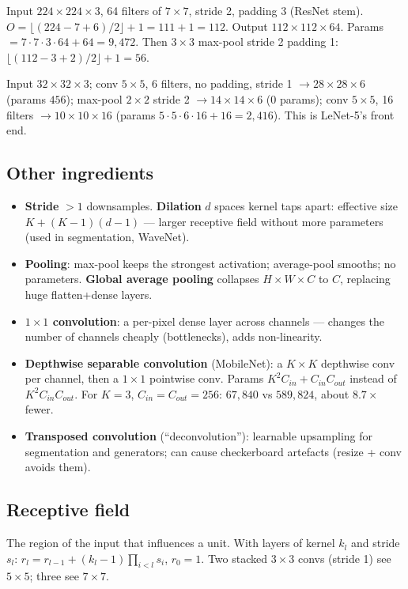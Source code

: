 \begin{example}
Input $224\times224\times3$, 64 filters of $7\times7$, stride 2, padding 3 (ResNet stem). $O=\lfloor(224-7+6)/2\rfloor+1=111+1=112$. Output $112\times112\times64$. Params $=7\cdot7\cdot3\cdot64+64=9{,}472$. Then $3\times3$ max-pool stride 2 padding 1: $\lfloor(112-3+2)/2\rfloor+1=56$.
\end{example}

\begin{example}
Input $32\times32\times3$; conv $5\times5$, 6 filters, no padding, stride 1 $\to28\times28\times6$ (params $456$); max-pool $2\times2$ stride 2 $\to14\times14\times6$ (0 params); conv $5\times5$, 16 filters $\to10\times10\times16$ (params $5\cdot5\cdot6\cdot16+16=2{,}416$). This is LeNet-5's front end.
\end{example}

\subsection{Other ingredients}
\begin{itemize}
  \item \textbf{Stride} $>1$ downsamples. \textbf{Dilation} $d$ spaces kernel taps apart: effective size $K+(K-1)(d-1)$ --- larger receptive field without more parameters (used in segmentation, WaveNet).
  \item \textbf{Pooling}: max-pool keeps the strongest activation; average-pool smooths; no parameters. \textbf{Global average pooling} collapses $H\times W\times C$ to $C$, replacing huge flatten+dense layers.
  \item \textbf{$1\times1$ convolution}: a per-pixel dense layer across channels --- changes the number of channels cheaply (bottlenecks), adds non-linearity.
  \item \textbf{Depthwise separable convolution} (MobileNet): a $K\times K$ depthwise conv per channel, then a $1\times1$ pointwise conv. Params $K^2C_{in}+C_{in}C_{out}$ instead of $K^2C_{in}C_{out}$. For $K=3$, $C_{in}=C_{out}=256$: $67{,}840$ vs $589{,}824$, about $8.7\times$ fewer.
  \item \textbf{Transposed convolution} (``deconvolution''): learnable upsampling for segmentation and generators; can cause checkerboard artefacts (resize + conv avoids them).
\end{itemize}

\subsection{Receptive field}
The region of the input that influences a unit. With layers of kernel $k_l$ and stride $s_l$: $r_l=r_{l-1}+(k_l-1)\prod_{i<l}s_i$, $r_0=1$. Two stacked $3\times3$ convs (stride 1) see $5\times5$; three see $7\times7$.

